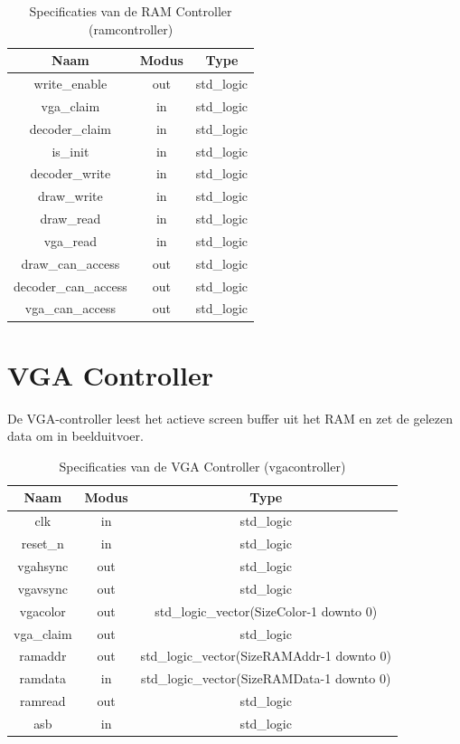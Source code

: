 \documentclass{scrreprt} %
\begin{document}
\begin{table}[H]
\centering
\caption{Specificaties van de RAM Controller (ramcontroller)}
\label{tab:spec-ramcontroller}
\begin{tabular}{c c c}
	\hline\hline
 	Naam & Modus & Type\\
 	\hline	
	write\_enable & out & std\_logic\\
	vga\_claim & in & std\_logic\\
	decoder\_claim & in & std\_logic\\
	is\_init & in & std\_logic\\
	decoder\_write & in & std\_logic\\
	draw\_write & in & std\_logic\\
	draw\_read & in & std\_logic\\
	vga\_read & in & std\_logic\\
	draw\_can\_access & out & std\_logic\\
	decoder\_can\_access & out & std\_logic\\
	vga\_can\_access & out & std\_logic\\
  	\hline
\end{tabular}
\end{table}

\section{VGA Controller}
De VGA-controller leest het actieve screen buffer uit het RAM en zet de gelezen data om in beelduitvoer.

\begin{table}[H]
\centering
\caption{Specificaties van de VGA Controller (vgacontroller)}
\label{tab:spec-vgacontroller}
\begin{tabular}{c c c}
	\hline\hline
 	Naam & Modus & Type\\
 	\hline	
	clk & in & std\_logic \\ 
	reset\_n & in & std\_logic \\ 
	vgahsync & out & std\_logic \\ 
	vgavsync & out & std\_logic \\ 
	vgacolor & out & std\_logic\_vector(SizeColor-1 downto 0) \\
	vga\_claim & out & std\_logic \\ 
	ramaddr & out & std\_logic\_vector(SizeRAMAddr-1 downto 0) \\
	ramdata & in & std\_logic\_vector(SizeRAMData-1 downto 0) \\ 
	ramread & out & std\_logic \\
	asb & in & std\_logic \\
  	\hline
\end{tabular}
\end{table}
\end{document}
